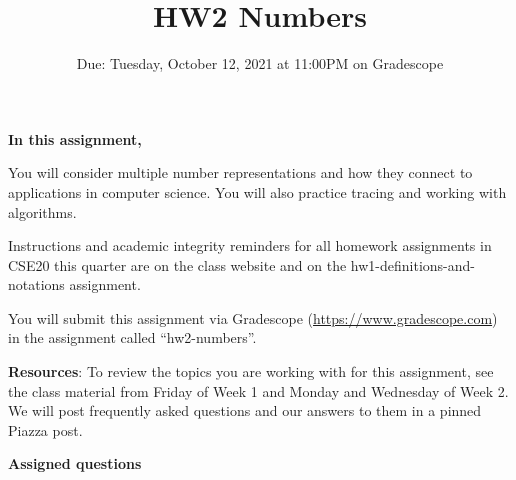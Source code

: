 

\title{HW2 Numbers}
\date{Due: Tuesday, October 12, 2021 at 11:00PM on Gradescope}


\maketitle
\thispagestyle{fancy}


{\bf In this assignment,}

You will consider multiple number representations and how they connect 
to applications in computer science. You will also practice tracing
and working with algorithms.

Instructions and academic integrity reminders for all homework assignments in 
CSE20 this quarter are on the class website and on the hw1-definitions-and-notations
assignment.


You will submit this assignment via Gradescope
(\href{https://www.gradescope.com}{https://www.gradescope.com}) 
in the assignment called ``hw2-numbers''.


{\bf Resources}: To review the topics you are working with 
for this assignment, see the class material from Friday of Week 1 and Monday
 and Wednesday of Week 2.
We will post frequently asked questions and our answers to them in a 
pinned Piazza post.

{\bf Assigned questions}

